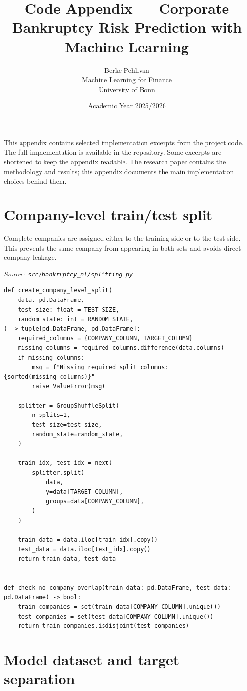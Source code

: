 \documentclass[10pt]{article}
\title{\textbf{Code Appendix --- Corporate Bankruptcy Risk Prediction with Machine Learning}}
\author{Berke Pehlivan\\Machine Learning for Finance\\University of Bonn}
\date{Academic Year 2025/2026}
\begin{document}
\maketitle

This appendix contains selected implementation excerpts from the project code.
The full implementation is available in the repository. Some excerpts are
shortened to keep the appendix readable. The research paper contains the
methodology and results; this appendix documents the main implementation
choices behind them.

\section{Company-level train/test split}

Complete companies are assigned either to the training side or to the test side.
This prevents the same company from appearing in both sets and avoids direct
company leakage.

\textit{Source: \texttt{src/bankruptcy\_ml/splitting.py}}

\begin{lstlisting}
def create_company_level_split(
    data: pd.DataFrame,
    test_size: float = TEST_SIZE,
    random_state: int = RANDOM_STATE,
) -> tuple[pd.DataFrame, pd.DataFrame]:
    required_columns = {COMPANY_COLUMN, TARGET_COLUMN}
    missing_columns = required_columns.difference(data.columns)
    if missing_columns:
        msg = f"Missing required split columns: {sorted(missing_columns)}"
        raise ValueError(msg)

    splitter = GroupShuffleSplit(
        n_splits=1,
        test_size=test_size,
        random_state=random_state,
    )

    train_idx, test_idx = next(
        splitter.split(
            data,
            y=data[TARGET_COLUMN],
            groups=data[COMPANY_COLUMN],
        )
    )

    train_data = data.iloc[train_idx].copy()
    test_data = data.iloc[test_idx].copy()
    return train_data, test_data


def check_no_company_overlap(train_data: pd.DataFrame, test_data: pd.DataFrame) -> bool:
    train_companies = set(train_data[COMPANY_COLUMN].unique())
    test_companies = set(test_data[COMPANY_COLUMN].unique())
    return train_companies.isdisjoint(test_companies)
\end{lstlisting}

\section{Model dataset and target separation}
\end{document}
